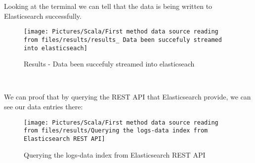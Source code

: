 \begin{spacing}{1.2}
\par Looking at the terminal we can tell that the data is being written to Elasticsearch successfully.
\\
\begin{figure}[!htb] 
\begin{center} 
\texttt{[image: Pictures/Scala/First method data source reading from files/results/results\_ Data been succefuly streamed into elasticseach]} 
\end{center} 
\caption{Results - Data been succefuly streamed into elasticseach} 
\end{figure}  \FloatBarrier
\\

\par We can proof that by querying the REST API that Elasticsearch provide, we can see our data entries there:
\\
\begin{figure}[!htb] 
\begin{center} 
\texttt{[image: Pictures/Scala/First method data source reading from files/results/Querying the logs-data index from Elasticsearch REST API]} 
\end{center} 
\caption{Querying the logs-data index from Elasticsearch REST API} 
\end{figure}  \FloatBarrier
\\

\end{spacing}